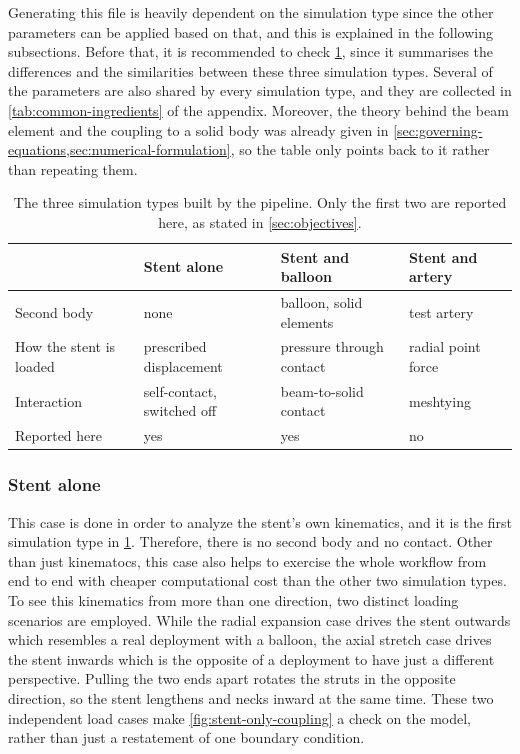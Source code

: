Generating this file is heavily dependent on the simulation type since the other parameters can be applied based on that, and this is explained in the following subsections. Before that, it is recommended to check \cref{tab:sim-types}, since it summarises the differences and the similarities between these three simulation types. Several of the parameters are also shared by every simulation type, and they are collected in \cref{tab:common-ingredients} of the appendix. Moreover, the theory behind the beam element and the coupling to a solid body was already given in \cref{sec:governing-equations,sec:numerical-formulation}, so the table only points back to it rather than repeating them.

\begin{table}[htb]
  \centering
  \begin{tabular}{@{}>{\raggedright\arraybackslash}m{}>{\raggedright\arraybackslash}m{}>{\raggedright\arraybackslash}m{}>{\raggedright\arraybackslash}m{}@{}}
    \toprule
     & \textbf{Stent alone} & \textbf{Stent and balloon} & \textbf{Stent and artery} \\
    \midrule
    Second body & none & balloon, solid elements & test artery \\
    \midrule
    How the stent is loaded & prescribed displacement & pressure through contact & radial point force \\
    \midrule
    Interaction & self-contact, switched off & beam-to-solid contact & meshtying \\
    \midrule
    Reported here & yes & yes & no \\
    \bottomrule
  \end{tabular}
  \caption{The three simulation types built by the pipeline. Only the first two are reported here, as stated in \cref{sec:objectives}.}
  \label{tab:sim-types}
\end{table}


\subsubsection{Stent alone}
\label{sec:step3-stent-only}


This case is done in order to analyze the stent's own kinematics, and it is the first simulation type in \cref{tab:sim-types}. Therefore, there is no second body and no contact. Other than just kinematocs, this case also helps to exercise the whole workflow from end to end with cheaper computational cost than the other two simulation types. To see this kinematics from more than one direction, two distinct loading scenarios are employed. While the radial expansion case drives the stent outwards which resembles a real deployment with a balloon, the axial stretch case drives the stent inwards which is the opposite of a deployment to have just a different perspective. Pulling the two ends apart rotates the struts in the opposite direction, so the stent lengthens and necks inward at the same time. These two independent load cases make \cref{fig:stent-only-coupling} a check on the model, rather than just a restatement of one boundary condition. 

